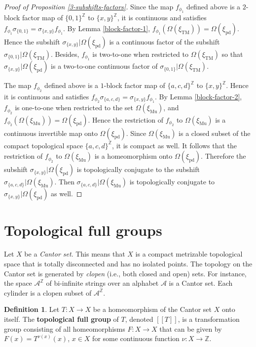 \documentclass[12pt]{article}
\theoremstyle{definition}
\newtheorem{definition}[theorem]{Definition}
\def\bZ{\mathbb{Z}}
\def\cA{\mathcal{A}}
\def\si{\sigma}
\def\Om{\Omega}
\def\xiTM{\xi_{\mathrm{TM}}}
\def\xipd{\xi_{\mathrm{pd}}}
\def\xiGE{\xi_{\mathrm{Mu}}}
\begin{document}
\begin{proof}[Proof of Proposition \ref{3-subshifts-factors}]
Since the map $f_{\phi_1}$ defined above is a $2$-block factor map of 
$\{0,1\}^{\bZ}$ to $\{x,y\}^{\bZ}$, it is continuous and satisfies 
$f_{\phi_1}\si_{\{0,1\}}=\si_{\{x,y\}}f_{\phi_1}$.  By Lemma 
\ref{block-factor-1}, $f_{\phi_1}(\Om(\xiTM))=\Om(\xipd)$.  Hence the 
subshift $\si_{\{x,y\}}|\Om(\xipd)$ is a continuous factor of the subshift 
$\si_{\{0,1\}}|\Om(\xiTM)$.  Besides, $f_{\phi_1}$ is two-to-one when 
restricted to $\Om(\xiTM)$ so that $\si_{\{x,y\}}|\Om(\xipd)$ is a 
two-to-one continuous factor of $\si_{\{0,1\}}|\Om(\xiTM)$.

The map $f_{\phi_2}$ defined above is a $1$-block factor map of 
$\{a,c,d\}^{\bZ}$ to $\{x,y\}^{\bZ}$.  Hence it is continuous and satisfies 
$f_{\phi_2}\si_{\{a,c,d\}}=\si_{\{x,y\}}f_{\phi_1}$.  By Lemma 
\ref{block-factor-2}, $f_{\phi_2}$ is one-to-one when restricted to the 
set $\Om(\xiGE)$, and $f_{\phi_2}(\Om(\xiGE))=\Om(\xipd)$.  Hence the 
restriction of $f_{\phi_2}$ to $\Om(\xiGE)$ is a continuous invertible map 
onto $\Om(\xipd)$.  Since $\Om(\xiGE)$ is a closed subset of the compact 
topological space $\{a,c,d\}^{\bZ}$, it is compact as well.  It follows 
that the restriction of $f_{\phi_2}$ to $\Om(\xiGE)$ is a homeomorphism 
onto $\Om(\xipd)$.  Therefore the subshift $\si_{\{x,y\}}|\Om(\xipd)$ is 
topologically conjugate to the subshift $\si_{\{a,c,d\}}|\Om(\xiGE)$.  Then 
$\si_{\{a,c,d\}}|\Om(\xiGE)$ is topologically conjugate to 
$\si_{\{x,y\}}|\Om(\xipd)$ as well.
\end{proof}

%
\section{Topological full groups}\label{sect-TFG}

Let $X$ be a \emph{Cantor set}.  This means that $X$ is a compact 
metrizable topological space that is totally disconnected and has no 
isolated points.  The topology on the Cantor set is generated by 
\emph{clopen} (i.e., both closed and open) sets.  For instance, the space 
$\cA^{\bZ}$ of bi-infinite strings over an alphabet $\cA$ is a Cantor set.  
Each cylinder is a clopen subset of $\cA^{\bZ}$.

\begin{definition}\label{def-TFG}
Let $T:X\to X$ be a homeomorphism of the Cantor set $X$ onto itself.  The 
\textbf{topological full group} of $T$, denoted $[[T]]$, is a transformation
group consisting of all homeomorphisms $F:X\to X$ that can be given by
$F(x)=T^{\nu(x)}(x)$, $x\in X$ for some continuous function $\nu:X\to\bZ$.
\end{definition}
\end{document}
